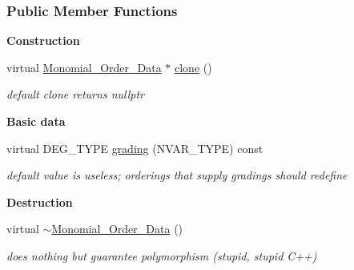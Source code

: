 \subsubsection*{Public Member Functions}
\begin{Indent}\textbf{ Construction}\par
\begin{DoxyCompactItemize}
\item 
\mbox{\label{group__orderinggroup_a636a75b3d5e776f9ed09668a3b9673c6}} 
virtual \hyperlink{group__orderinggroup_class_monomial___order___data}{Monomial\+\_\+\+Order\+\_\+\+Data} $\ast$ \hyperlink{group__orderinggroup_a636a75b3d5e776f9ed09668a3b9673c6}{clone} ()
\begin{DoxyCompactList}\small\item\em default clone returns {\ttfamily nullptr} \end{DoxyCompactList}\end{DoxyCompactItemize}
\end{Indent}
\begin{Indent}\textbf{ Basic data}\par
\begin{DoxyCompactItemize}
\item 
\mbox{\label{group__orderinggroup_a581ab0398e12b7c0ad80212ad50e86b8}} 
virtual D\+E\+G\+\_\+\+T\+Y\+PE \hyperlink{group__orderinggroup_a581ab0398e12b7c0ad80212ad50e86b8}{grading} (N\+V\+A\+R\+\_\+\+T\+Y\+PE) const
\begin{DoxyCompactList}\small\item\em default value is useless; orderings that supply gradings should redefine \end{DoxyCompactList}\end{DoxyCompactItemize}
\end{Indent}
\begin{Indent}\textbf{ Destruction}\par
\begin{DoxyCompactItemize}
\item 
\mbox{\label{group__orderinggroup_a278b8c06b208d8549ba2f871f93239be}} 
virtual \hyperlink{group__orderinggroup_a278b8c06b208d8549ba2f871f93239be}{$\sim$\+Monomial\+\_\+\+Order\+\_\+\+Data} ()
\begin{DoxyCompactList}\small\item\em does nothing but guarantee polymorphism (stupid, stupid C++) \end{DoxyCompactList}\end{DoxyCompactItemize}
\end{Indent}
\label{class_monomial___ordering}
